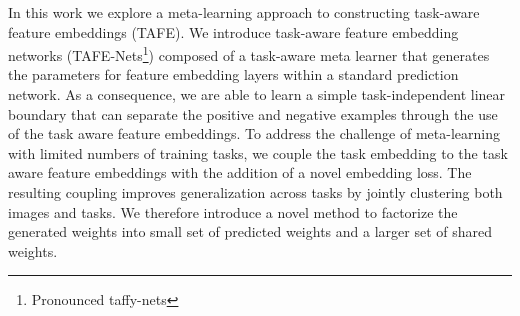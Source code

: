 \documentclass[10pt,twocolumn,letterpaper]{article}
\newcommand{\xin}[1]{\textcolor{red}{[Xin: #1]}}
\newcommand{\joey}[1]{\textcolor{blue}{[Joey: #1]}}
\newcommand{\modelplural}{TAFE-Nets\xspace}
\begin{document}
In this work we explore a meta-learning approach to constructing task-aware feature embeddings (TAFE).  
We introduce task-aware feature embedding networks
(\modelplural\footnote{Pronounced taffy-nets}) composed of a task-aware meta learner that generates the parameters for feature embedding layers within a standard prediction network.
As a consequence, we are able to learn a simple task-independent linear boundary that can separate the positive and negative examples through the use of the task aware feature embeddings. 
To address the challenge of meta-learning with limited numbers of training tasks, we couple the task embedding to the task aware feature embeddings with the addition of a novel embedding loss.
The resulting coupling improves generalization across tasks by jointly clustering both images and tasks.
We therefore introduce a novel method to factorize the generated
weights into small set of predicted weights and a larger set of shared weights.
\end{document}
